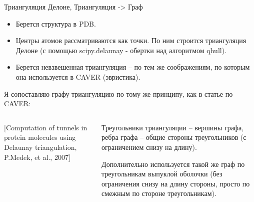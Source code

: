 \documentclass[10pt, xcolor={dvipsnames}]{beamer}
\begin{document}
\small
\begin{frame}{Триангуляция Делоне, Триангуляция -> Граф}
\begin{itemize}
\item Берется структура в PDB.
\item Центры атомов рассматриваются как точки. По ним строится триангуляция Делоне (с помощью scipy.delaunay - обертки над алгоритмом qhull).
\item Берется невзвешенная триангуляция -- по тем же соображениям, по которым она используется в CAVER (эвристика).
\end{itemize}
Я сопоставляю графу триангуляцию по тому же принципу, как в статье по CAVER:
\begin{columns}
\begin{column}{0.5\textwidth}
\begin{center}

[Computation of tunnels in protein molecules using
Delaunay triangulation, P.Medek, et al., 2007]
\end{center}
\end{column}
\begin{column}{0.5\textwidth}
Треугольники триангуляции -- вершины графа, ребра графа -- общие стороны треугольников (с ограничением снизу на длину).

Дополнительно используется такой же граф по треугольникам выпуклой оболочки (без ограничения снизу на длину стороны, просто по смежным по стороне треугольникам).
\end{column}
\end{columns}


\end{frame}
\end{document}
